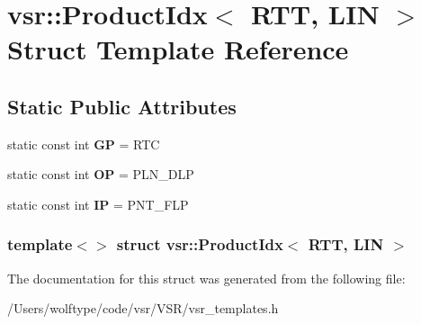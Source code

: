 \hypertarget{structvsr_1_1_product_idx_3_01_r_t_t_00_01_l_i_n_01_4}{\section{vsr\-:\-:Product\-Idx$<$ R\-T\-T, L\-I\-N $>$ Struct Template Reference}
\label{structvsr_1_1_product_idx_3_01_r_t_t_00_01_l_i_n_01_4}
}
\subsection*{Static Public Attributes}
\begin{DoxyCompactItemize}
\item 
\hypertarget{structvsr_1_1_product_idx_3_01_r_t_t_00_01_l_i_n_01_4_a3bb546834f9771b9ee64be1e3b8ab36a}{static const int {\bfseries G\-P} = R\-T\-C}\label{structvsr_1_1_product_idx_3_01_r_t_t_00_01_l_i_n_01_4_a3bb546834f9771b9ee64be1e3b8ab36a}

\item 
\hypertarget{structvsr_1_1_product_idx_3_01_r_t_t_00_01_l_i_n_01_4_a3c2cd6232e23a422ce9bca0e64098736}{static const int {\bfseries O\-P} = P\-L\-N\-\_\-\-D\-L\-P}\label{structvsr_1_1_product_idx_3_01_r_t_t_00_01_l_i_n_01_4_a3c2cd6232e23a422ce9bca0e64098736}

\item 
\hypertarget{structvsr_1_1_product_idx_3_01_r_t_t_00_01_l_i_n_01_4_a32c7112177622342ba3b9af7916e5cf8}{static const int {\bfseries I\-P} = P\-N\-T\-\_\-\-F\-L\-P}\label{structvsr_1_1_product_idx_3_01_r_t_t_00_01_l_i_n_01_4_a32c7112177622342ba3b9af7916e5cf8}

\end{DoxyCompactItemize}
\subsubsection*{template$<$$>$ struct vsr\-::\-Product\-Idx$<$ R\-T\-T, L\-I\-N $>$}



The documentation for this struct was generated from the following file\-:\begin{DoxyCompactItemize}
\item 
/\-Users/wolftype/code/vsr/\-V\-S\-R/vsr\-\_\-templates.\-h\end{DoxyCompactItemize}
